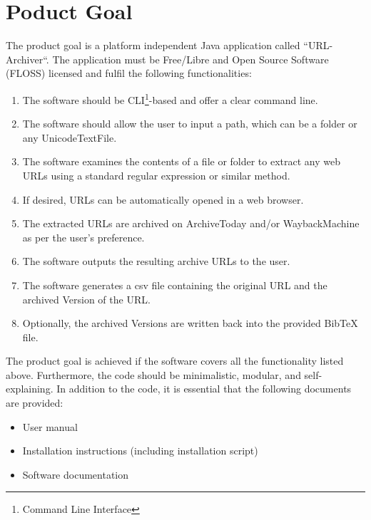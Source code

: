 \section{Poduct Goal}
The product goal  is a platform independent Java application called ``\gls{URL-Archiver}``.
The application must be Free/Libre and Open Source Software (\gls{FLOSS}) licensed and fulfil the following functionalities:
\begin{enumerate}
    \item The software should be \gls{CLI}\footnote{Command Line Interface}-based and offer a clear command line.
    \item The software should allow the user to input a path, which can be a folder or any \gls{UnicodeTextFile}.
    \item The software examines the contents of a file or folder to extract any web \glspl{URL} using a standard regular expression or similar method.
    \item If desired, URLs can be automatically opened in a web browser.
    \item The extracted URLs are archived on \gls{ArchiveToday} and/or \gls{WaybackMachine} as per the user's preference.
    \item The software outputs the resulting archive URLs to the user.
    \item The software generates a \gls{csv} file containing the original URL and the archived Version of the URL.
    \item Optionally, the archived Versions are written back into the provided \gls{BibTeX} file.
\end{enumerate}
The product goal is achieved if the software covers all the functionality listed above.
Furthermore, the code should be minimalistic, modular, and self-explaining.
In addition to the code, it is essential that the following documents are provided:
\begin{itemize}
    \item User manual
    \item Installation instructions (including installation script)
    \item Software documentation
\end{itemize}


